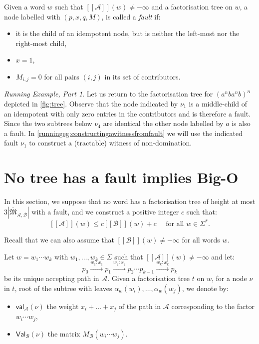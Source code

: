 \documentclass{lmcs}
\theoremstyle{remark}
\newcommand{\ideal}{\mathfrak{M}}
\newcommand{\autA}{\mathcal{A}}
\newcommand{\autB}{\mathcal{B}}
\newcommand{\brfunc}[1]{[\![#1]\!]}
\newcommand{\funcA}{\brfunc{\autA}}
\newcommand{\funcB}{\brfunc{\autB}}
\newcommand{\aval}{\mathsf{val}_\autA}
\newcommand{\bval}{\mathsf{Val}_\autB}
\theoremstyle{remark}
\newtheorem{runningexample/}{Running Example, Part}
\newenvironment{runningexample}
  {\renewcommand{\qedsymbol}{\color{darkgray}\ensuremath{\lrcorner}}%
   \pushQED{\qed}\begin{runningexample/}}
  {\popQED\end{runningexample/}}
\begin{document}
Given a word $w$ such that $\funcA(w) \neq -\infty$ and a factorisation tree on $w$, a node labelled with $(p,x,q,M)$, is called a \emph{fault} if:
\begin{itemize}
\item it is the child of an idempotent node, but is neither the left-most nor the right-most child,
\item $x = 1$,
\item $M_{i,j} = 0$ for all pairs $(i,j)$ in its set of contributors.
\end{itemize}

\begin{runningexample}
Let us return to the factorisation tree for $(a^nba^nb)^n$ depicted in \cref{fig:tree}. Observe that the node indicated by $\nu_1$ is a middle-child of an idempotent with only zero entries in the contributors and is therefore a fault.
Since the two subtrees below $\nu_4$ are identical the other node labelled by $a$ is also a fault. In \cref{runningeg:constructingawitnessfromfault}  we will use the  indicated fault $\nu_1$ to construct a (tractable) witness of non-domination.
\end{runningexample}

\section{No tree has a fault implies Big-O}
\label{1implies4}
\setcounter{case}{0}

In this section, we suppose that no word has a factorisation tree of height at most $3|\overline{\ideal}_{\autA,\autB}|$ with a fault, and we construct a positive integer $c$ such that: 
\begin{equation}\label{eq:bigoformula}
\funcA(w) \leq c\funcB(w) + c \quad \text{ for all } w\in\Sigma^*.
\end{equation}

Recall that we can also assume that $\funcB(w) \neq -\infty$ for all words $w$.

Let $w = w_1\cdots w_k$ with $w_1, \ldots, w_k \in \Sigma$ such that $\funcA(w) \neq -\infty$ and let:
$$p_0 \xrightarrow{w_1:x_1} p_1 \xrightarrow{w_2:x_2} p_2 \dotsm p_{k-1}\xrightarrow{w_{k}:x_k} p_k$$ 
be its unique accepting path in $\autA$. Given a factorisation tree $t$ on $w$, for a node $\nu$ in $t$, root of the subtree with leaves $\alpha_w(w_i), \ldots, \alpha_w(w_j)$, we denote by:
\begin{itemize}
\item $\aval(\nu)$ the weight $x_i+ \ldots + x_j$ of the path in $\autA$ corresponding to the factor $w_i \cdots w_j$, 
\item $\bval(\nu)$ the matrix $M_\autB(w_i \cdots w_j)$.
\end{itemize}
\end{document}
